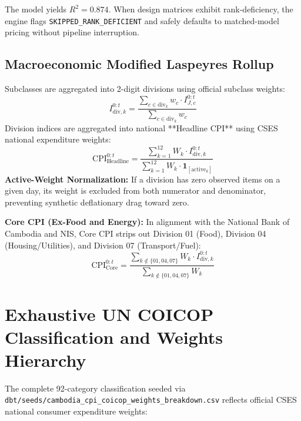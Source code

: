 \documentclass[11pt,a4paper,oneside]{article}
\begin{document}
The model yields $R^2 = 0.874$. When design matrices exhibit rank-deficiency, the engine flags \texttt{SKIPPED\_RANK\_DEFICIENT} and safely defaults to matched-model pricing without pipeline interruption.

\subsection{Macroeconomic Modified Laspeyres Rollup}
Subclasses are aggregated into 2-digit divisions using official subclass weights:
\begin{equation}
I_{\text{div}, k}^{0:t} = \frac{\sum_{c \in \text{div}_k} w_c \cdot I_{J, c}^{0:t}}{\sum_{c \in \text{div}_k} w_c}
\end{equation}
Division indices are aggregated into national **Headline CPI** using CSES national expenditure weights:
\begin{equation}
\text{CPI}_{\text{Headline}}^{0:t} = \frac{\sum_{k=1}^{12} W_k \cdot I_{\text{div}, k}^{0:t}}{\sum_{k=1}^{12} W_k \cdot \mathbf{1}_{[\text{active}_k]}}
\end{equation}
\textbf{Active-Weight Normalization:} If a division has zero observed items on a given day, its weight is excluded from both numerator and denominator, preventing synthetic deflationary drag toward zero.

\textbf{Core CPI (Ex-Food and Energy):}
In alignment with the National Bank of Cambodia and NIS, Core CPI strips out Division 01 (Food), Division 04 (Housing/Utilities), and Division 07 (Transport/Fuel):
\begin{equation}
\text{CPI}_{\text{Core}}^{0:t} = \frac{\sum_{k \notin \{01, 04, 07\}} W_k \cdot I_{\text{div}, k}^{0:t}}{\sum_{k \notin \{01, 04, 07\}} W_k}
\end{equation}

\newpage

\section{Exhaustive UN COICOP Classification and Weights Hierarchy}

The complete 92-category classification seeded via \texttt{dbt/seeds/cambodia\_cpi\_coicop\_weights\_breakdown.csv} reflects official CSES national consumer expenditure weights:
\end{document}
